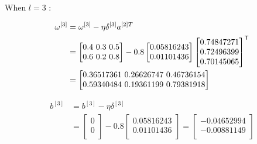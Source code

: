 \documentclass{article}
\begin{document}
When $l = 3$ :

\[
    \begin{aligned}
        \omega^{[3]} & =\omega^{[3]}-\eta\delta^{[3]}a^{[2]T} \\
                     & =\begin{bmatrix}
                            0.4 $ 0.3 $ 0.5 \\
                            0.6 $ 0.2 $ 0.8 \\
                        \end{bmatrix}
        - 0.8 \begin{bmatrix}
                  0.05816243 \\
                  0.01101436 \\
              \end{bmatrix}
        \begin{bmatrix}
            0.74847271 \\
            0.72496399 \\
            0.70145065 \\
        \end{bmatrix}^{\mathsf{T}}                      \\
                     & = \begin{bmatrix}
                             0.36517361 $ 0.26626747 $ 0.46736154 \\
                             0.59340484 $ 0.19361199 $ 0.79381918 \\
                         \end{bmatrix}
    \end{aligned}
\]

\[
    \begin{aligned}
        b^{[3]} & =b^{[3]}-\eta\delta^{[3]} \\
                & =\begin{bmatrix}
                       0 \\
                       0 \\
                   \end{bmatrix}
        - 0.8 \begin{bmatrix}
                  0.05816243 \\
                  0.01101436 \\
              \end{bmatrix}
        = \begin{bmatrix}
              -0.04652994 \\
              -0.00881149 \\
          \end{bmatrix}
    \end{aligned}
\]
\end{document}
